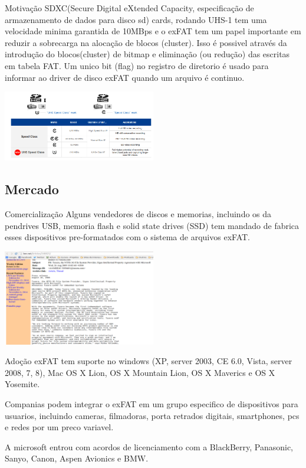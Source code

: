 \documentclass[11pt]{beamer}
\begin{document}
\begin{frame}{Motivação}
SDXC(Secure Digital eXtended Capacity, especificação de armazenamento de dados para disco sd) cards, rodando UHS-1 tem uma velocidade minima garantida de 10MBps e o exFAT tem um papel importante em reduzir a sobrecarga na alocação de blocos (cluster). Isso é possivel  através da introdução do blocos(cluster) de bitmap e eliminação (ou redução) das escritas em tabela FAT. Um unico bit (flag) no registro de diretorio é usado para informar ao driver de disco exFAT quando um arquivo é continuo.
\begin{center}
 \includegraphics[width=0.5\textwidth]{uhs1.png} 
\end{center}
\end{frame}



\subsection{Mercado}
\begin{frame}{Comercialização}
Alguns vendedores de discos e memorias, incluindo os da pendrives USB, memoria flash e solid state drives (SSD) tem mandado de fabrica esses dispositivos pre-formatados com o sistema de arquivos exFAT.

\begin{center}
 \includegraphics[width=0.5\textwidth]{tuxeraemail.png}
\end{center} 
\end{frame}

\begin{frame}{Adoção}
exFAT tem suporte no windows (XP, server 2003, CE 6.0, Vista, server 2008, 7, 8), Mac OS X Lion, OS X Mountain Lion, OS X Maverics e OS X Yosemite.

Companias podem integrar o exFAT em um grupo especifico de dispositivos para usuarios, incluindo cameras, filmadoras, porta retrados digitais, smartphones, pcs e redes por um preco variavel.

A microsoft entrou com acordos de licenciamento com a BlackBerry, Panasonic, Sanyo, Canon, Aspen Avionics e BMW.
\end{frame}
\end{document}
